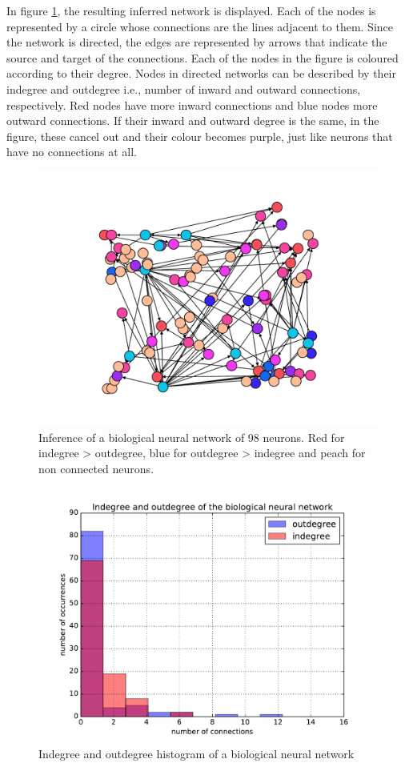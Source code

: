 In figure \ref{fig:crcns_4_network}, the resulting inferred network is displayed. Each of the nodes is represented by a circle whose connections are the lines adjacent to them. Since the network is directed, the edges are represented by arrows that indicate the source and target of the connections. Each of the nodes in the figure is coloured according to their degree. Nodes in directed networks can be described by their indegree and outdegree i.e., number of inward and outward connections, respectively. Red nodes have more inward connections and blue nodes more outward connections. If their inward and outward degree is the same, in the figure, these cancel out and their colour becomes purple, just like neurons that have no connections at all. \\

\begin{figure}
	\centering
	\includegraphics[width=0.8\linewidth]{crcns_4_50_xy.pdf}
	\caption{Inference of a biological neural network of 98 neurons. Red for indegree > outdegree, blue for outdegree > indegree and peach for non connected neurons.}
	\label{fig:crcns_4_network}
\end{figure}

\begin{figure}
	\centering
	\includegraphics[width=0.8\linewidth]{degree_histogram_real_network.pdf}
	\caption{Indegree and outdegree histogram of a biological neural network}
	\label{fig:degree_histogram}
\end{figure}

